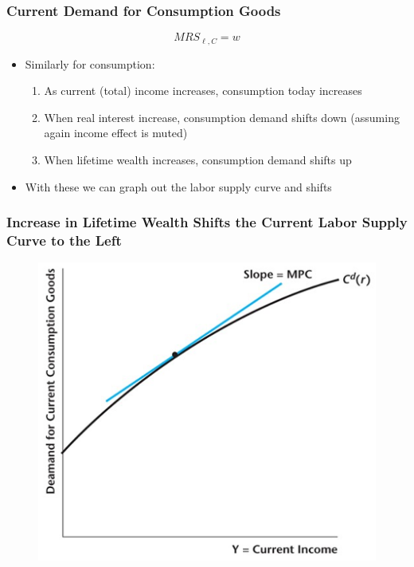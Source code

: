 \documentclass{beamer}
\begin{document}
\begin{frame}
\frametitle[alignment=center]{Current Demand for Consumption Goods}
$$MRS_{\ell,C}=w$$
\begin{itemize}
\item Similarly for consumption:
\begin{enumerate}
\item As current (total) income increases, consumption today increases
\item When real interest increase, consumption demand shifts down (assuming again income effect is muted)
\item When lifetime wealth increases, consumption demand shifts up
\end{enumerate}
\item With these we can graph out the labor supply curve and shifts
\end{itemize}
\end{frame}

\begin{frame}
\frametitle[alignment=center]{Increase in Lifetime Wealth Shifts the Current Labor Supply Curve to the Left}
\begin{figure}
\centering
\includegraphics[scale=0.6]{Figures/W_Fig_11pt4.png}
\end{figure}
\end{frame}
\end{document}

